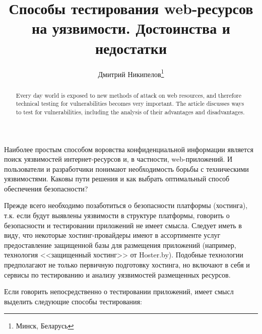 \documentclass[10pt, a5paper]{article}
\begin{document}
\title{Способы тестирования web-ресурсов на уязвимости. Достоинства и недостатки}%

\author{Дмитрий  Никипелов\footnote{Минск, Беларусь}}
\maketitle

\begin{abstract}
Every day world is exposed to new methods of attack on web resources, and therefore technical testing for vulnerabilities \linebreak becomes very important. The article discusses ways to test for vulnerabilities, including the analysis of their advantages and disadvantages.
\end{abstract}

Наиболее простым способом воровства конфиденциальной информации является поиск уязвимостей интернет-ресурсов и, в частности, web-приложений. И пользователи и разработчики понимают необходимость борьбы с техническими уязвимостями. Каковы пути решения и как выбрать оптимальный способ обеспечения безопасности?

Прежде всего необходимо позаботиться о безопасности платформы (хостинга), т.к. если будут выявлены уязвимости в структуре платформы, говорить о безопасности и тестировании приложений не имеет смысла. Следует иметь в виду, что некоторые хостинг-провайдеры имеют в ассортименте услуг предоставление защищенной базы для размещения приложений (например, технология <<защищенный хостинг>> от Hoster.by). Подобные технологии предполагают не только первичную подготовку хостинга, но включают в себя и сервисы по тестированию и анализу уязвимостей размещенных ресурсов.

Если говорить непосредственно о тестировании приложений, \linebreak имеет смысл выделить следующие способы тестирования:
\end{document}
